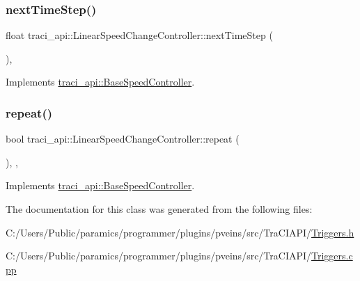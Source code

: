 \subsubsection{\texorpdfstring{next\+Time\+Step()}{nextTimeStep()}}
{\footnotesize\ttfamily float traci\+\_\+api\+::\+Linear\+Speed\+Change\+Controller\+::next\+Time\+Step (\begin{DoxyParamCaption}{ }\end{DoxyParamCaption})\hspace{0.3cm}{\ttfamily [override]}, {\ttfamily [virtual]}}



Implements \hyperlink{classtraci__api_1_1_base_speed_controller_ab9658ce36f91de8a34bb710b3241c210}{traci\+\_\+api\+::\+Base\+Speed\+Controller}.

\mbox{\label{classtraci__api_1_1_linear_speed_change_controller_aaa5f31ea0c57db838a5786509fc03446}} 
\subsubsection{\texorpdfstring{repeat()}{repeat()}}
{\footnotesize\ttfamily bool traci\+\_\+api\+::\+Linear\+Speed\+Change\+Controller\+::repeat (\begin{DoxyParamCaption}{ }\end{DoxyParamCaption})\hspace{0.3cm}{\ttfamily [inline]}, {\ttfamily [override]}, {\ttfamily [virtual]}}



Implements \hyperlink{classtraci__api_1_1_base_speed_controller_a2d4b22945d4cb27f5fe24b05700021b6}{traci\+\_\+api\+::\+Base\+Speed\+Controller}.



The documentation for this class was generated from the following files\+:\begin{DoxyCompactItemize}
\item 
C\+:/\+Users/\+Public/paramics/programmer/plugins/pveins/src/\+Tra\+C\+I\+A\+P\+I/\hyperlink{_triggers_8h}{Triggers.\+h}\item 
C\+:/\+Users/\+Public/paramics/programmer/plugins/pveins/src/\+Tra\+C\+I\+A\+P\+I/\hyperlink{_triggers_8cpp}{Triggers.\+cpp}\end{DoxyCompactItemize}
